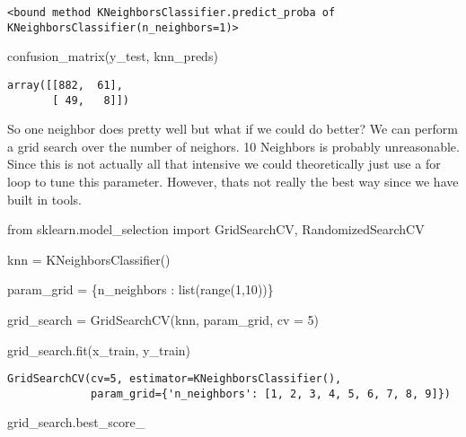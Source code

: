 \documentclass[
  letterpaper,
  DIV=11,
  numbers=noendperiod]{scrreprt}
\newenvironment{Shaded}{\begin{snugshade}}{\end{snugshade}}
\newcommand{\BuiltInTok}[1]{\textcolor[rgb]{0.00,0.23,0.31}{#1}}
\newcommand{\DecValTok}[1]{\textcolor[rgb]{0.68,0.00,0.00}{#1}}
\newcommand{\ImportTok}[1]{\textcolor[rgb]{0.00,0.46,0.62}{#1}}
\newcommand{\NormalTok}[1]{\textcolor[rgb]{0.00,0.23,0.31}{#1}}
\newcommand{\OperatorTok}[1]{\textcolor[rgb]{0.37,0.37,0.37}{#1}}
\newcommand{\StringTok}[1]{\textcolor[rgb]{0.13,0.47,0.30}{#1}}
\begin{document}
\begin{verbatim}
<bound method KNeighborsClassifier.predict_proba of KNeighborsClassifier(n_neighbors=1)>
\end{verbatim}

\begin{Shaded}
\begin{Highlighting}[]
\NormalTok{confusion\_matrix(y\_test, knn\_preds)}
\end{Highlighting}
\end{Shaded}

\begin{verbatim}
array([[882,  61],
       [ 49,   8]])
\end{verbatim}

So one neighbor does pretty well but what if we could do better? We can
perform a grid search over the number of neighors. 10 Neighbors is
probably unreasonable. Since this is not actually all that intensive we
could theoretically just use a for loop to tune this parameter. However,
thats not really the best way since we have built in tools.

\begin{Shaded}
\begin{Highlighting}[]
\ImportTok{from}\NormalTok{ sklearn.model\_selection }\ImportTok{import}\NormalTok{ GridSearchCV, RandomizedSearchCV}

\NormalTok{knn }\OperatorTok{=}\NormalTok{ KNeighborsClassifier()}

\NormalTok{param\_grid }\OperatorTok{=}\NormalTok{ \{}\StringTok{\textquotesingle{}n\_neighbors\textquotesingle{}}\NormalTok{ : }\BuiltInTok{list}\NormalTok{(}\BuiltInTok{range}\NormalTok{(}\DecValTok{1}\NormalTok{,}\DecValTok{10}\NormalTok{))\}}

\NormalTok{grid\_search }\OperatorTok{=}\NormalTok{ GridSearchCV(knn, param\_grid, cv }\OperatorTok{=} \DecValTok{5}\NormalTok{)}

\NormalTok{grid\_search.fit(x\_train, y\_train)}
\end{Highlighting}
\end{Shaded}

\begin{verbatim}
GridSearchCV(cv=5, estimator=KNeighborsClassifier(),
             param_grid={'n_neighbors': [1, 2, 3, 4, 5, 6, 7, 8, 9]})
\end{verbatim}

\begin{Shaded}
\begin{Highlighting}[]
\NormalTok{grid\_search.best\_score\_}
\end{Highlighting}
\end{Shaded}
\end{document}
